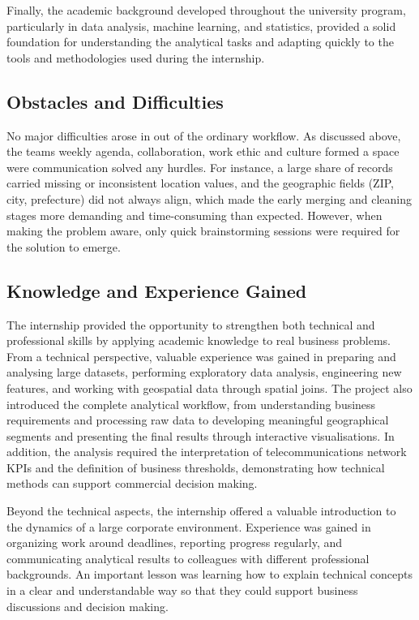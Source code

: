 \documentclass[12pt, a4paper, oneside]{report}
\begin{document}
Finally, the academic background developed throughout the university program, particularly in data analysis, machine learning, and statistics, provided a solid foundation for understanding the analytical tasks and adapting quickly to the tools and methodologies used during the internship.

\subsection{Obstacles and Difficulties}
No major difficulties arose in out of the ordinary workflow. As discussed above, the teams weekly agenda, collaboration, work ethic and culture formed a space were communication solved any hurdles.  For instance, a large share of records carried missing or inconsistent location values, and the geographic fields (ZIP, city, prefecture) did not always align, which made the early merging and cleaning stages more demanding and time-consuming than expected. However, when making the problem aware, only quick brainstorming sessions were required for the solution to emerge.

\subsection{Knowledge and Experience Gained}
The internship provided the opportunity to strengthen both technical and professional skills by applying academic knowledge to real business problems. From a technical perspective, valuable experience was gained in preparing and analysing large datasets, performing exploratory data analysis, engineering new features, and working with geospatial data through spatial joins. The project also introduced the complete analytical workflow, from understanding business requirements and processing raw data to developing meaningful geographical segments and presenting the final results through interactive visualisations. In addition, the analysis required the interpretation of telecommunications network KPIs and the definition of business thresholds, demonstrating how technical methods can support commercial decision making.

Beyond the technical aspects, the internship offered a valuable introduction to the dynamics of a large corporate environment. Experience was gained in organizing work around deadlines, reporting progress regularly, and communicating analytical results to colleagues with different professional backgrounds. An important lesson was learning how to explain technical concepts in a clear and understandable way so that they could support business discussions and decision making.
\end{document}
